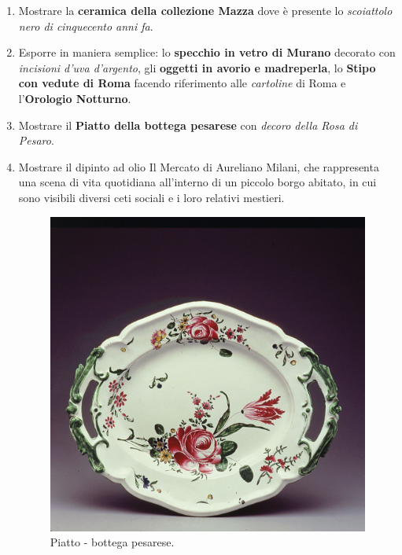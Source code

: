 \documentclass[12pt,a4paper]{article}
\begin{document}
\begin{enumerate}
	\item Mostrare la \textbf{ceramica della collezione Mazza} dove è presente lo \textit{scoiattolo nero di cinquecento anni fa}.
	\item Esporre in maniera semplice: lo \textbf{specchio in vetro di Murano} decorato con \textit{incisioni d'uva d'argento},  gli \textbf{oggetti in avorio e madreperla}, lo \textbf{Stipo con vedute di Roma} facendo riferimento alle \textit{cartoline} di Roma e l'\textbf{Orologio Notturno}.
	\item Mostrare il \textbf{Piatto della bottega pesarese} con \textit{decoro della Rosa di Pesaro}.
	\item Mostrare il dipinto ad olio Il Mercato di Aureliano Milani, che rappresenta una scena di vita quotidiana all'interno di un piccolo borgo abitato, in cui sono visibili diversi ceti sociali e i loro relativi mestieri.
	\begin{figure}[h]
		\centering
		\includegraphics[]{Piatto_pesaro.jpg}
		\caption{Piatto - bottega pesarese.}
	\end{figure}
	

\end{enumerate}
\end{document}
